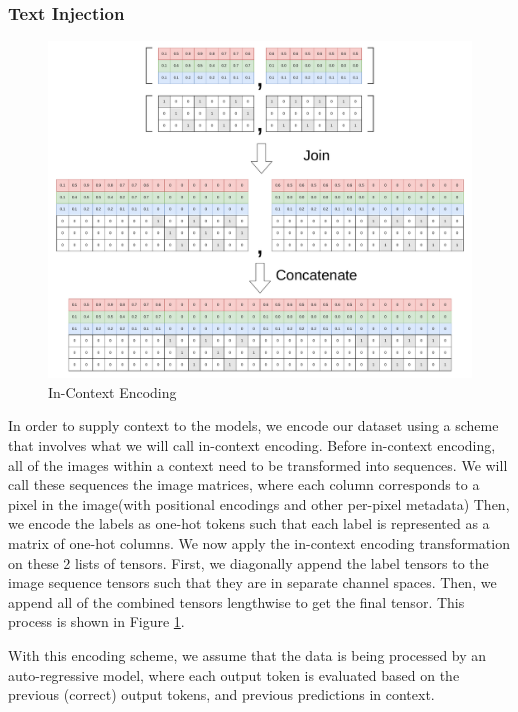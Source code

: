 \subsubsection{Text Injection}
\begin{figure}
    \includegraphics[width=\textwidth]{figures/in_context_encoding.pdf}
    \caption{In-Context Encoding}
    \label{incontextencoding}
\end{figure}

In order to supply context to the models, we encode our dataset using a scheme
that involves what we will call in-context encoding.
Before in-context encoding, all of the images within a context need to be
transformed into sequences.
We will call these sequences the image matrices, where each column corresponds
to a pixel in the image(with positional encodings and other per-pixel metadata)
Then, we encode the labels as one-hot tokens such that each label is represented
as a matrix of one-hot columns.
We now apply the in-context encoding transformation on these 2 lists of tensors.
First, we diagonally append the label tensors to the image sequence tensors such
that they are in separate channel spaces.
Then, we append all of the combined tensors lengthwise to get the final tensor.
This process is shown in Figure \ref{incontextencoding}.

With this encoding scheme, we assume that the data is being processed by an
auto-regressive model, where each output token is evaluated based on the
previous (correct) output tokens, and previous predictions in context.

